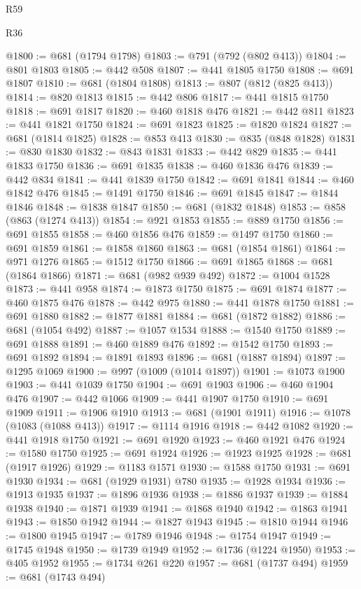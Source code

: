 \begin{lexlean}{R59}
\begin{lexlean}{R36}
\begin{coremodule}
{{{{{{{{{{{{{{{{{{{{{{{{{{{{{{{{{{{{{{{{{{{{{{{{{{{{{{{{{{{{{{{{{{{{{{{{{{{{{{{{{{@1800 := @681 (@1794 @1798)
@1803 := @791 (@792 (@802 @413))
@1804 := @801 @1803
@1805 := @442 @508
@1807 := @441 @1805 @1750
@1808 := @691 @1807
@1810 := @681 (@1804 @1808)
@1813 := @807 (@812 (@825 @413))
@1814 := @820 @1813
@1815 := @442 @806
@1817 := @441 @1815 @1750
@1818 := @691 @1817
@1820 := @460 @1818 @476
@1821 := @442 @811
@1823 := @441 @1821 @1750
@1824 := @691 @1823
@1825 := @1820 @1824
@1827 := @681 (@1814 @1825)
@1828 := @853 @413
@1830 := @835 (@848 @1828)
@1831 := @830 @1830
@1832 := @843 @1831
@1833 := @442 @829
@1835 := @441 @1833 @1750
@1836 := @691 @1835
@1838 := @460 @1836 @476
@1839 := @442 @834
@1841 := @441 @1839 @1750
@1842 := @691 @1841
@1844 := @460 @1842 @476
@1845 := @1491 @1750
@1846 := @691 @1845
@1847 := @1844 @1846
@1848 := @1838 @1847
@1850 := @681 (@1832 @1848)
@1853 := @858 (@863 (@1274 @413))
@1854 := @921 @1853
@1855 := @889 @1750
@1856 := @691 @1855
@1858 := @460 @1856 @476
@1859 := @1497 @1750
@1860 := @691 @1859
@1861 := @1858 @1860
@1863 := @681 (@1854 @1861)
@1864 := @971 @1276
@1865 := @1512 @1750
@1866 := @691 @1865
@1868 := @681 (@1864 @1866)
@1871 := @681 (@982 @939 @492)
@1872 := @1004 @1528
@1873 := @441 @958
@1874 := @1873 @1750
@1875 := @691 @1874
@1877 := @460 @1875 @476
@1878 := @442 @975
@1880 := @441 @1878 @1750
@1881 := @691 @1880
@1882 := @1877 @1881
@1884 := @681 (@1872 @1882)
@1886 := @681 (@1054 @492)
@1887 := @1057 @1534
@1888 := @1540 @1750
@1889 := @691 @1888
@1891 := @460 @1889 @476
@1892 := @1542 @1750
@1893 := @691 @1892
@1894 := @1891 @1893
@1896 := @681 (@1887 @1894)
@1897 := @1295 @1069
@1900 := @997 (@1009 (@1014 @1897))
@1901 := @1073 @1900
@1903 := @441 @1039 @1750
@1904 := @691 @1903
@1906 := @460 @1904 @476
@1907 := @442 @1066
@1909 := @441 @1907 @1750
@1910 := @691 @1909
@1911 := @1906 @1910
@1913 := @681 (@1901 @1911)
@1916 := @1078 (@1083 (@1088 @413))
@1917 := @1114 @1916
@1918 := @442 @1082
@1920 := @441 @1918 @1750
@1921 := @691 @1920
@1923 := @460 @1921 @476
@1924 := @1580 @1750
@1925 := @691 @1924
@1926 := @1923 @1925
@1928 := @681 (@1917 @1926)
@1929 := @1183 @1571
@1930 := @1588 @1750
@1931 := @691 @1930
@1934 := @681 (@1929 @1931) @780
@1935 := @1928 @1934
@1936 := @1913 @1935
@1937 := @1896 @1936
@1938 := @1886 @1937
@1939 := @1884 @1938
@1940 := @1871 @1939
@1941 := @1868 @1940
@1942 := @1863 @1941
@1943 := @1850 @1942
@1944 := @1827 @1943
@1945 := @1810 @1944
@1946 := @1800 @1945
@1947 := @1789 @1946
@1948 := @1754 @1947
@1949 := @1745 @1948
@1950 := @1739 @1949
@1952 := @1736 (@1224 @1950)
@1953 := @405 @1952
@1955 := @1734 @261 @220
@1957 := @681 (@1737 @494)
@1959 := @681 (@1743 @494)
}}}}}}}}}}}}}}}}}}}}}}}}}}}}}}}}}}}}}}}}}}}}}}}}}}}}}}}}}}}}}}}}}}}}}}}}}}}}}}}}}}
\end{coremodule}
\end{lexlean}
\end{lexlean}
